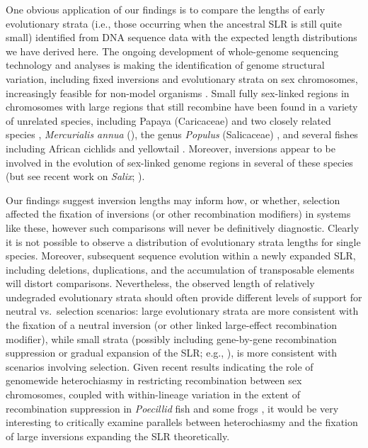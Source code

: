 \documentclass{article}[12pt]
\begin{document}
One obvious application of our findings is to compare the lengths of early evolutionary strata (i.e., those occurring when the ancestral SLR is still quite small) identified from DNA sequence data with the expected length distributions we have derived here. The ongoing development of whole-genome sequencing technology and analyses is making the identification of genome structural variation, including fixed inversions and evolutionary strata on sex chromosomes, increasingly feasible for non-model organisms \citep[reviewed in ][]{Muyle2017, Charlesworth2018,PandayAzad2016}. Small fully sex-linked regions in chromosomes with large regions that still recombine have been found in a variety of unrelated species, including Papaya (Caricaceae) and two closely related species \citep{Wang2012, Lovene2015}, {\itshape Mercurialis annua} (\citealt{VeltsosPannell2019}), the genus {\itshape Populus}  (Salicaceae) \citep[reviewed in][]{HobzaEtAl2018}, and several fishes including African cichlids \citep{GammerdingerKocher2018} and yellowtail \citep{KoyamaEtAl2015}. Moreover, inversions appear to be involved in the evolution of sex-linked genome regions in several of these species (but see recent work on {\itshape Salix}; \citealt{AlmeidaMank2019}). 

Our findings suggest inversion lengths may inform how, or whether, selection affected the fixation of inversions (or other recombination modifiers) in  systems like these, however such comparisons will never be definitively diagnostic. Clearly it is not possible to observe a distribution of evolutionary strata lengths for single species. Moreover, subsequent sequence evolution within a newly expanded SLR, including deletions, duplications, and the accumulation of transposable elements will distort comparisons. Nevertheless, the observed length of relatively undegraded evolutionary strata should often provide different levels of support for neutral vs.~selection scenarios: large evolutionary strata are more consistent with the fixation of a neutral inversion (or other linked large-effect recombination modifier), while small strata (possibly including gene-by-gene recombination suppression or gradual expansion of the SLR; e.g., \citealt{BergeroQiuCharlesworth2013, QiuBergeroCharlesworth2015}), is more consistent with scenarios involving selection. Given recent results indicating the role of genomewide heterochiasmy in restricting recombination between sex chromosomes, coupled with within-lineage variation in the extent of recombination suppression in {\itshape Poecillid} fish and some frogs \citep[e.g.,][]{Wright2017,BergeroCharlesworth2019,DaroltiWrightMank2019,FurmanEvans2018}, it would be very interesting to critically examine parallels between heterochiasmy and the fixation of large inversions expanding the SLR theoretically.
\end{document}
